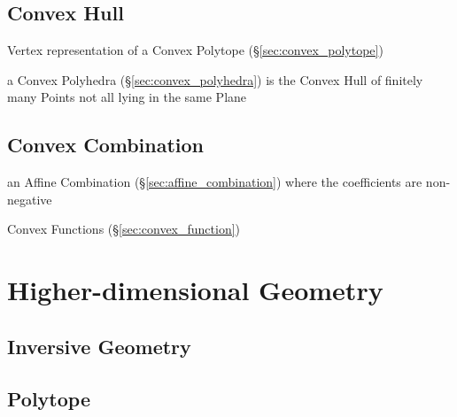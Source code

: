 \subsection{Convex Hull}\label{sec:convex_hull}

Vertex representation of a Convex Polytope (\S\ref{sec:convex_polytope})

a Convex Polyhedra (\S\ref{sec:convex_polyhedra}) is the Convex Hull of
finitely many Points not all lying in the same Plane



\subsection{Convex Combination}\label{sec:convex_combination}

an Affine Combination (\S\ref{sec:affine_combination}) where the coefficients
are non-negative

\fist Convex Functions (\S\ref{sec:convex_function})



\section{Higher-dimensional Geometry}\label{sec:higher_geometry}

\subsection{Inversive Geometry}\label{sec:inversive_geometry}

\subsection{Polytope}\label{sec:polytope}

